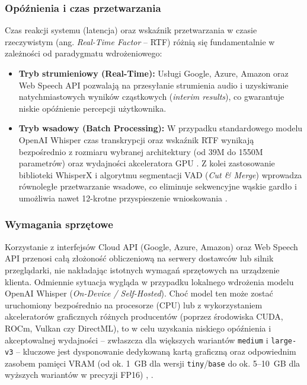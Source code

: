 \subsubsection{Opóźnienia i czas przetwarzania}
Czas reakcji systemu (latencja) oraz wskaźnik przetwarzania w czasie rzeczywistym (ang. \textit{Real-Time Factor} -- RTF) różnią się fundamentalnie w zależności od paradygmatu wdrożeniowego:
\begin{itemize}
    \item \textbf{Tryb strumieniowy (Real-Time):} Usługi Google, Azure, Amazon oraz Web Speech API pozwalają na przesyłanie strumienia audio i uzyskiwanie natychmiastowych wyników cząstkowych (\textit{interim results}), co gwarantuje niskie opóźnienie percepcji użytkownika.
    \item \textbf{Tryb wsadowy (Batch Processing):} W przypadku standardowego modelu OpenAI Whisper czas transkrypcji oraz wskaźnik RTF wynikają bezpośrednio z rozmiaru wybranej architektury (od 39M do 1550M parametrów) \cite[s.~5]{radford2023robust} oraz wydajności akceleratora GPU \cite[s.~18]{pudo2024optimizing}. Z kolei zastosowanie biblioteki WhisperX i algorytmu segmentacji VAD (\textit{Cut \& Merge}) wprowadza równoległe przetwarzanie wsadowe, co eliminuje sekwencyjne wąskie gardło i umożliwia nawet 12-krotne przyspieszenie wnioskowania \cite[s.~1, 4]{bain2023whisperx}.
\end{itemize}

\subsubsection{Wymagania sprzętowe}
Korzystanie z interfejsów Cloud API (Google, Azure, Amazon) oraz Web Speech API przenosi całą złożoność obliczeniową na serwery dostawców lub silnik przeglądarki, nie nakładając istotnych wymagań sprzętowych na urządzenie klienta. Odmiennie sytuacja wygląda w przypadku lokalnego wdrożenia modelu OpenAI Whisper (\textit{On-Device / Self-Hosted}). Choć model ten może zostać uruchomiony bezpośrednio na procesorze (CPU) lub z wykorzystaniem akceleratorów graficznych różnych producentów (poprzez środowiska CUDA, ROCm, Vulkan czy DirectML), to w celu uzyskania niskiego opóźnienia i akceptowalnej wydajności -- zwłaszcza dla większych wariantów \texttt{medium} i \texttt{large-v3} -- kluczowe jest dysponowanie dedykowaną kartą graficzną oraz odpowiednim zasobem pamięci VRAM (od ok. 1~GB dla wersji \texttt{tiny}/\texttt{base} do ok. 5--10~GB dla wyższych wariantów w precyzji FP16) \cite[s.~5]{radford2023robust}, \cite[s.~18]{pudo2024optimizing}.

